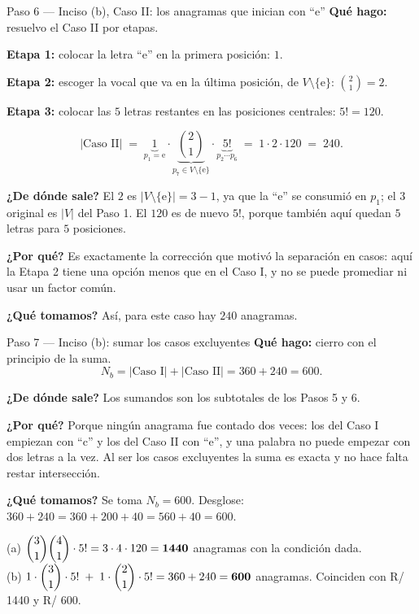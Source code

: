\documentclass[11pt]{article}
\begin{document}
\begin{paso}{Paso 6 --- Inciso (b), Caso II: los anagramas que inician con ``e''}
\textbf{Qué hago:} resuelvo el Caso II por etapas.

\medskip
\textbf{Etapa 1:} colocar la letra ``e'' en la primera posición: $1$.

\textbf{Etapa 2:} escoger la vocal que va en la última posición, de $V\setminus\{\text{e}\}$: $\displaystyle\binom{2}{1}=2$.

\textbf{Etapa 3:} colocar las $5$ letras restantes en las posiciones centrales: $5!=120$.

\medskip
\[
  |\text{Caso II}| \;=\; \underbrace{1}_{p_1=\text{e}} \cdot \underbrace{\binom{2}{1}}_{p_7\in V\setminus\{\text{e}\}} \cdot \underbrace{5!}_{p_2\cdots p_6} \;=\; 1\cdot 2\cdot 120 \;=\; 240 .
\]

\textbf{¿De dónde sale?} El $2$ es $|V\setminus\{\text{e}\}|=3-1$, ya que la ``e'' se consumió en $p_1$; el $3$ original es $|V|$ del Paso 1. El $120$ es de nuevo $5!$, porque también aquí quedan $5$ letras para $5$ posiciones.

\textbf{¿Por qué?} Es exactamente la corrección que motivó la separación en casos: aquí la Etapa 2 tiene una opción menos que en el Caso I, y no se puede promediar ni usar un factor común.

\textbf{¿Qué tomamos?} Así, para este caso hay $240$ anagramas.
\end{paso}

\begin{paso}{Paso 7 --- Inciso (b): sumar los casos excluyentes}
\textbf{Qué hago:} cierro con el principio de la suma.
\[
  N_b = |\text{Caso I}|+|\text{Caso II}| = 360+240 = 600 .
\]

\textbf{¿De dónde sale?} Los sumandos son los subtotales de los Pasos 5 y 6.

\textbf{¿Por qué?} Porque ningún anagrama fue contado dos veces: los del Caso I empiezan con ``c'' y los del Caso II con ``e'', y una palabra no puede empezar con dos letras a la vez. Al ser los casos excluyentes la suma es exacta y no hace falta restar intersección.

\textbf{¿Qué tomamos?} Se toma $N_b=600$. Desglose: $360+240=360+200+40=560+40=600$.
\end{paso}

\begin{resp}
(a) $\dbinom{3}{1}\dbinom{4}{1}\cdot 5! = 3\cdot 4\cdot 120 = \mathbf{1440}$ anagramas con la condición dada.\\[2pt]
(b) $1\cdot\dbinom{3}{1}\cdot 5! \;+\; 1\cdot\dbinom{2}{1}\cdot 5! = 360+240=\mathbf{600}$ anagramas. Coinciden con R/ 1440 y R/ 600.
\end{resp}
\end{document}

